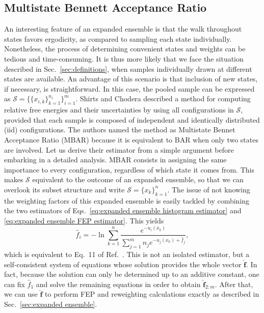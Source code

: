 \documentclass[aip,jcp,reprint,amsmath,amssymb]{revtex4-1}
\newcommand{\vt}[1]{\boldsymbol{\mathbf{#1}}}           %
\begin{document}
\subsection{Multistate Bennett Acceptance Ratio}

An interesting feature of an expanded ensemble is that the walk throughout states favors ergodicity, as compared to sampling each state individually. Nonetheless, the process of determining convenient states and weights can be tedious and time-consuming. It is thus more likely that we face the situation described in Sec.~\ref{sec:definitions}, when samples individually drawn at different states are available. An advantage of this scenario is that inclusion of new states, if necessary, is straightforward. In this case, the pooled sample can be expressed as $\mathcal S = \big\{\{x_{i,k}\}_{k=1}^{n_i} \big\}_{i=1}^m$. Shirts and Chodera\cite{Shirts_2008} described a method for computing relative free energies and their uncertainties by using all configurations in $\mathcal S$, provided that each sample is composed of independent and identically distributed (iid) configurations. The authors named the method as Multistate Bennet Acceptance Ratio (MBAR) because it is equivalent to BAR when only two states are involved. Let us derive their estimator from a simple argument before embarking in a detailed analysis. MBAR consists in assigning the same importance to every configuration, regardless of which state it comes from. This makes $\mathcal S$ equivalent to the outcome of an expanded ensemble, so that we can overlook its subset structure and write $\mathcal S = \{x_k\}_{k=1}^n$. The issue of not knowing the weighting factors of this expanded ensemble is easily tackled by combining the two estimators of Eqs.~\eqref{eq:expanded ensemble histogram estimator} and \eqref{eq:expanded ensemble FEP estimator}. This yields
\begin{equation}
\label{eq:mbar free energy estimator}
\hat f_i = -\ln \sum_{k=1}^n \frac{e^{-u_i(x_k)}}{\sum_{j=1}^m n_j e^{-u_j(x_k) + \hat f_j}},
\end{equation}
which is equivalent to Eq.~11 of Ref.~. This is not an isolated estimator, but a self-consistent system of equations whose solution provides the whole vector $\hat {\vt f}$. In fact, because the solution can only be determined up to an additive constant, one can fix $\hat f_1$ and solve the remaining equations in order to obtain $\hat{\vt f}_{2:m}$. After that, we can use $\hat{\vt f}$ to perform FEP and reweighting calculations exactly as described in Sec.~\ref{sec:expanded ensemble}.\cite{Geyer_1994, Shirts_2017}
\end{document}
